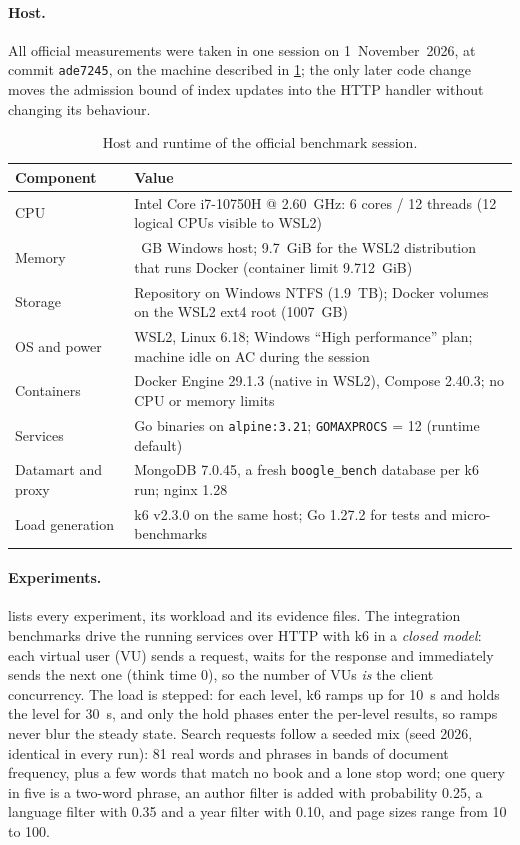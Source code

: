 \documentclass[10pt,a4paper]{article}
\newcommand{\code}[1]{\texttt{#1}}
\begin{document}
\paragraph{Host.}
All official measurements were taken in one session on 1~November~2026, at
commit \code{ade7245}, on the machine described in \cref{tab:host}; the only
later code change moves the admission bound of index updates into the HTTP
handler without changing its behaviour.

\begin{table}[htbp]
  \centering
  \small
  \caption{Host and runtime of the official benchmark session.}
  \label{tab:host}
  \begin{tabularx}{\textwidth}{@{}l>{\raggedright\arraybackslash}X@{}}
    \toprule
    Component & Value \\
    \midrule
    CPU & Intel Core i7-10750H @ 2.60~GHz: 6 cores / 12 threads (12 logical CPUs
      visible to WSL2) \\
    Memory & 15.8~GB Windows host; 9.7~GiB for the WSL2 distribution that runs
      Docker (container limit 9.712~GiB) \\
    Storage & Repository on Windows NTFS (1.9~TB); Docker volumes on the WSL2
      ext4 root (1007~GB) \\
    OS and power & WSL2, Linux 6.18; Windows ``High performance'' plan; machine
      idle on AC during the session \\
    Containers & Docker Engine 29.1.3 (native in WSL2), Compose 2.40.3; no CPU
      or memory limits \\
    Services & Go binaries on \code{alpine:3.21}; \code{GOMAXPROCS} = 12 (runtime
      default) \\
    Datamart and proxy & MongoDB 7.0.45, a fresh \code{boogle\_bench} database per
      k6 run; nginx 1.28 \\
    Load generation & k6 v2.3.0 on the same host; Go 1.27.2 for tests and
      micro-benchmarks \\
    \bottomrule
  \end{tabularx}
\end{table}

\paragraph{Experiments.}
 lists every experiment, its workload and its evidence
files. The integration benchmarks drive the running services over HTTP with
k6 in a \emph{closed model}: each virtual user (VU) sends a request, waits for
the response and immediately sends the next one (think time 0), so the number
of VUs \emph{is} the client concurrency. The load is stepped: for each level,
k6 ramps up for 10~s and holds the level for 30~s, and only the hold phases
enter the per-level results, so ramps never blur the steady state. Search
requests follow a seeded mix (seed 2026, identical in every run): 81 real
words and phrases in bands of document frequency, plus a few words that match
no book and a lone stop word; one query in five is a two-word phrase, an
author filter is added with probability 0.25, a language filter with 0.35 and
a year filter with 0.10, and page sizes range from 10 to 100.
\end{document}
